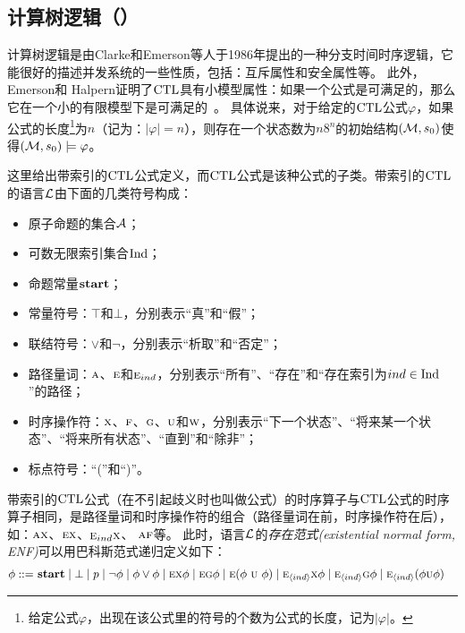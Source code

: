 \subsection{计算树逻辑（\CTL）}
计算树逻辑是由Clarke和Emerson等人于1986年提出的一种分支时间时序逻辑\cite{DBLP:journals/toplas/ClarkeES86}，它能很好的描述并发系统的一些性质，包括：互斥属性和安全属性等。
此外，Emerson和 Halpern证明了$\textrm{CTL}$具有小模型属性：如果一个公式是可满足的，那么它在一个小的有限模型下是可满足的~\cite{DBLP:journals/jcss/EmersonH85}。
具体说来，对于给定的$\textrm{CTL}$公式$\varphi$，如果公式的长度\footnote{给定公式$\varphi$，出现在该公式里的符号的个数为公式的长度，记为$|\varphi|$。}为$n$（记为：$|\varphi| = n$），则存在一个状态数为$n8^n$的初始结构$({\cal M},s_0)$使得$({\cal M},s_0)\models \varphi$。

这里给出带索引的$\textrm{CTL}$公式定义，而$\textrm{CTL}$公式是该种公式的子类。带索引的$\textrm{CTL}$的语言${\cal L}$由下面的几类符号构成：
\begin{itemize}
	\item 原子命题的集合${\cal A}$；
	\item 可数无限索引集合$\textrm{Ind}$；
	\item 命题常量$\textbf{start}$；
	\item 常量符号：$\top$和$\bot$，分别表示“真”和“假”；
	\item 联结符号：$\vee$和$\neg$，分别表示“析取”和“否定”；
	\item 路径量词：$\textsc{a}$、$\textsc{e}$和$\textsc{e}_{ind}$，分别表示“所有”、“存在”和“存在索引为$ind\in \textrm{Ind}$”的路径；
	\item 时序操作符：$\textsc{x}$、$\textsc{f}$、$\textsc{g}$、$\textsc{u}$和$\textsc{w}$，分别表示“下一个状态”、“将来某一个状态”、“将来所有状态”、“直到”和“除非”；
	\item 标点符号：“(”和“)”。
\end{itemize}
带索引的$\textrm{CTL}$公式（在不引起歧义时也叫做公式）的时序算子与$\textrm{CTL}$公式的时序算子相同，是路径量词和时序操作符的组合（路径量词在前，时序操作符在后），如：$\textsc{a} \textsc{x}$、$\textsc{e} \textsc{x}$、$\textsc{e}_{ind} \textsc{x}$、 $\textsc{a} \textsc{f}$等。
此时，语言$\cal L$的\emph{存在范式(existential normal form, ENF)}可以用巴科斯范式递归定义如下：
	\begin{align*}
	\phi  ::= & \ \start\mid \bot %
	\mid p \mid\neg\phi \mid \phi\lor\phi \mid
	\EXIST \NEXT \phi \mid
	\EXIST \GLOBAL \phi \mid
	\EXIST (\phi\ \UNTILL\ \phi)\mid
	\EXIST_{\tuple{ind}}\NEXT \phi  \mid
	\EXIST_{\tuple{ind}}\GLOBAL \phi \mid
	\EXIST_{\tuple{ind}}(\phi \UNTILL \phi) %
\end{align*}

